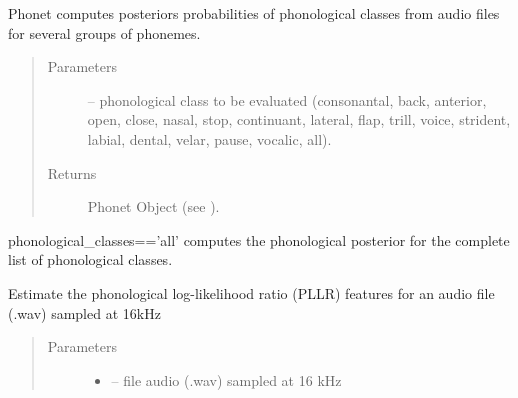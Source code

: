 \documentclass[letterpaper,10pt,english]{sphinxmanual}
\begin{document}
\begin{fulllineitems}
\label{\detokenize{index:phonet.Phonet}}
Phonet computes posteriors probabilities of phonological classes from audio files for several groups of phonemes.
\begin{quote}\begin{description}
\item[{Parameters}] \leavevmode
{} -- phonological class to be evaluated (\sphinxquotedblleft{}consonantal\sphinxquotedblright{}, \sphinxquotedblleft{}back\sphinxquotedblright{}, \sphinxquotedblleft{}anterior\sphinxquotedblright{}, \sphinxquotedblleft{}open\sphinxquotedblright{}, \sphinxquotedblleft{}close\sphinxquotedblright{}, \sphinxquotedblleft{}nasal\sphinxquotedblright{}, \sphinxquotedblleft{}stop\sphinxquotedblright{},
\sphinxquotedblleft{}continuant\sphinxquotedblright{},  \sphinxquotedblleft{}lateral\sphinxquotedblright{}, \sphinxquotedblleft{}flap\sphinxquotedblright{}, \sphinxquotedblleft{}trill\sphinxquotedblright{}, \sphinxquotedblleft{}voice\sphinxquotedblright{}, \sphinxquotedblleft{}strident\sphinxquotedblright{},
\sphinxquotedblleft{}labial\sphinxquotedblright{}, \sphinxquotedblleft{}dental\sphinxquotedblright{}, \sphinxquotedblleft{}velar\sphinxquotedblright{}, \sphinxquotedblleft{}pause\sphinxquotedblright{}, \sphinxquotedblleft{}vocalic\sphinxquotedblright{}, \sphinxquotedblleft{}all\sphinxquotedblright{}).

\item[{Returns}] \leavevmode
Phonet Object (see ).

\end{description}\end{quote}

phonological\_classes=='all' computes the phonological posterior for the complete list of phonological classes.

\begin{fulllineitems}
\label{\detokenize{index:phonet.Phonet.get_PLLR}}
Estimate the phonological log-likelihood ratio (PLLR) features for an audio file (.wav) sampled at 16kHz
\begin{quote}\begin{description}
\item[{Parameters}] \leavevmode\begin{itemize}
\item {} 
 -- file audio (.wav) sampled at 16 kHz


\end{itemize}
\end{description}
\end{quote}
\end{fulllineitems}
\end{fulllineitems}
\end{document}

